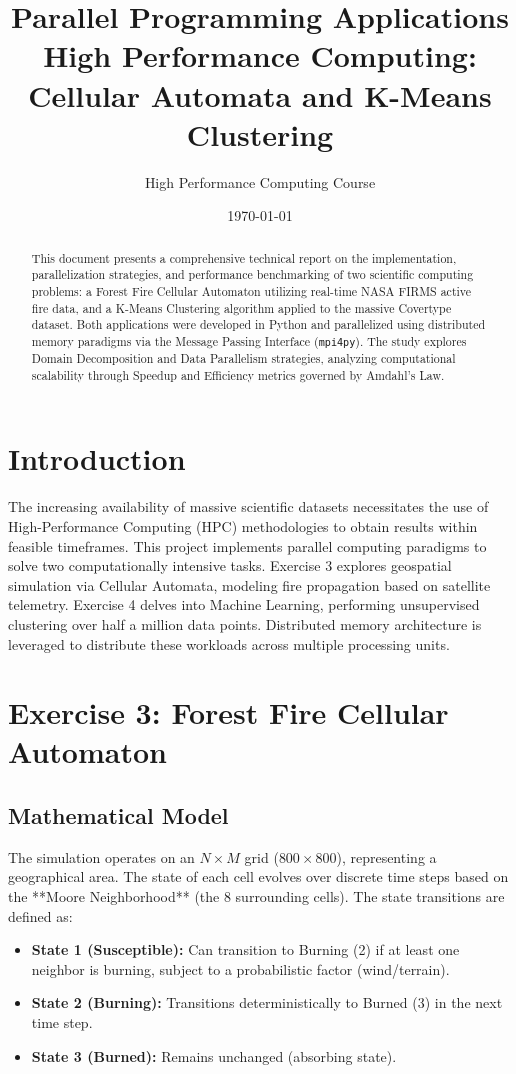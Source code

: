 \documentclass[12pt,a4paper]{article}
\title{\textbf{Parallel Programming Applications}\\ \large High Performance Computing: Cellular Automata and K-Means Clustering}
\author{High Performance Computing Course}
\date{\today}
\begin{document}
\maketitle

\begin{abstract}
This document presents a comprehensive technical report on the implementation, parallelization strategies, and performance benchmarking of two scientific computing problems: a Forest Fire Cellular Automaton utilizing real-time NASA FIRMS active fire data, and a K-Means Clustering algorithm applied to the massive Covertype dataset. Both applications were developed in Python and parallelized using distributed memory paradigms via the Message Passing Interface (\texttt{mpi4py}). The study explores Domain Decomposition and Data Parallelism strategies, analyzing computational scalability through Speedup and Efficiency metrics governed by Amdahl's Law.
\end{abstract}

\tableofcontents
\newpage

\section{Introduction}
The increasing availability of massive scientific datasets necessitates the use of High-Performance Computing (HPC) methodologies to obtain results within feasible timeframes. This project implements parallel computing paradigms to solve two computationally intensive tasks. Exercise 3 explores geospatial simulation via Cellular Automata, modeling fire propagation based on satellite telemetry. Exercise 4 delves into Machine Learning, performing unsupervised clustering over half a million data points. Distributed memory architecture is leveraged to distribute these workloads across multiple processing units.

\section{Exercise 3: Forest Fire Cellular Automaton}

\subsection{Mathematical Model}
The simulation operates on an $N \times M$ grid ($800 \times 800$), representing a geographical area. The state of each cell evolves over discrete time steps based on the **Moore Neighborhood** (the 8 surrounding cells). The state transitions are defined as:
\begin{itemize}
    \item \textbf{State 1 (Susceptible):} Can transition to Burning (2) if at least one neighbor is burning, subject to a probabilistic factor (wind/terrain).
    \item \textbf{State 2 (Burning):} Transitions deterministically to Burned (3) in the next time step.
    \item \textbf{State 3 (Burned):} Remains unchanged (absorbing state).
\end{itemize}
\end{document}
